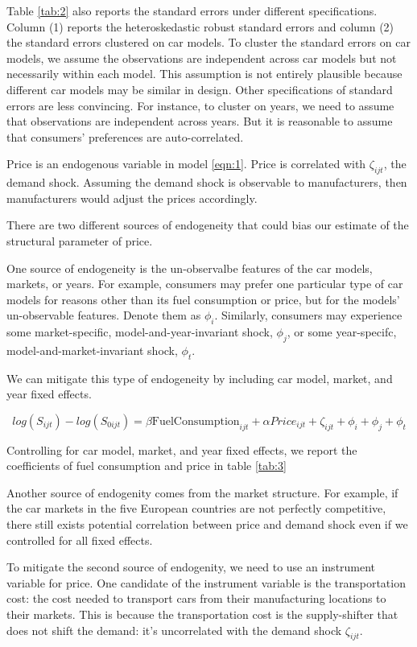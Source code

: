\documentclass[12pt]{article}
\begin{document}
Table \ref{tab:2} also reports the standard errors under different specifications.  Column (1) reports the heteroskedastic robust standard errors and column (2) the standard errors clustered on car models.  To cluster the standard errors on car models, we assume the observations are independent across car models but not necessarily within each model.  This assumption is not entirely plausible because different car models may be similar in design.  Other specifications of standard errors are less convincing.  For instance, to cluster on years, we need to assume that observations are independent across years.  But it is reasonable to assume that consumers' preferences are auto-correlated. 

Price is an endogenous variable in model \ref{eqn:1}. Price is correlated with $\zeta_{ijt}$, the demand shock. Assuming the demand shock is observable to manufacturers, then manufacturers would adjust the prices accordingly.

There are two different sources of endogeneity that could bias our estimate of the structural parameter of price.

One source of endogeneity is the un-observalbe features of the car models, markets, or years. For example, consumers may prefer one particular type of car models for reasons other than its fuel consumption or price, but for the models' un-observable features. Denote them as $\phi_i$. Similarly, consumers may experience some market-specific, model-and-year-invariant shock, $\phi_j$, or some year-specifc, model-and-market-invariant shock, $\phi_t$.

We can mitigate this type of endogeneity by including car model, market, and year fixed effects.

\begin{equation} \label{eqn:2}
log(S_{ijt}) - log(S_{0ijt}) = \beta \text{FuelConsumption}_{ijt} + \alpha Price_{ijt} + \zeta_{ijt} + \phi_i + \phi_j + \phi_t
\end{equation}

Controlling for car model, market, and year fixed effects, we report the coefficients of fuel consumption and price in table \ref{tab:3}

\begin{table}[H]
\centering

\end{table}

Another source of endogenity comes from the market structure. For example, if the car markets in the five European countries are not perfectly competitive, there still exists potential correlation between price and demand shock even if we controlled for all fixed effects.

To mitigate the second source of endogenity, we need to use an instrument variable for price. One candidate of the instrument variable is the transportation cost: the cost needed to transport cars from their manufacturing locations to their markets. This is because the transportation cost is the supply-shifter that does not shift the demand: it's uncorrelated with the demand shock $\zeta_{ijt}$.
\end{document}
